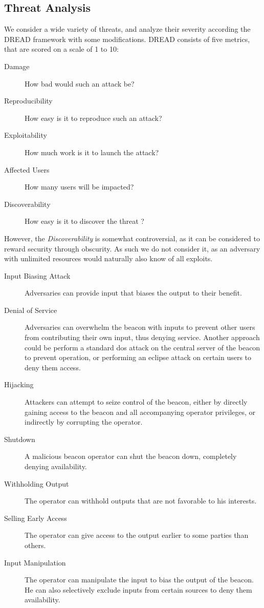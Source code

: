 \subsection{Threat Analysis}
We consider a wide variety of threats, and analyze their severity according the DREAD framework with some modifications. DREAD consists of five metrics\cite{DREAD}, that are scored on a scale of 1 to 10:
\begin{description}
    \item [Damage] How bad would such an attack be?
    \item [Reproducibility] How easy is it to reproduce such an attack?
    \item [Exploitability] How much work is it to launch the attack?
    \item [Affected Users] How many users will be impacted?
    \item [Discoverability] How easy is it to discover the threat ? 
\end{description}

However, the \emph{Discoverability} is somewhat controversial, as it can be considered to reward security through obscurity. As such we do not consider it, as an adversary with unlimited resources would naturally also know of all exploits. 
\begin{description}
    \item [Input Biasing Attack] Adversaries can provide input that biases the output to their benefit. 
    \item [Denial of Service] Adversaries can overwhelm the beacon with inputs to prevent other users from contributing their own input, thus denying service. Another approach could be perform a standard \gls{dos} attack on the central server of the beacon to prevent operation, or performing an eclipse attack on certain users to deny them access. 
    \item [Hijacking] Attackers can attempt to seize control of the beacon, either by directly gaining access to the beacon and all accompanying operator privileges, or indirectly by corrupting the operator. 
    \item [Shutdown] A malicious beacon operator can shut the beacon down, completely denying availability.
    \item [Withholding Output] The operator can withhold outputs that are not favorable to his interests.
    \item [Selling Early Access] The operator can give access to the output earlier to some parties than others.
    \item [Input Manipulation] The operator can manipulate the input to bias the output of the beacon. He can also selectively exclude inputs from certain sources to deny them availability.

\end{description}
